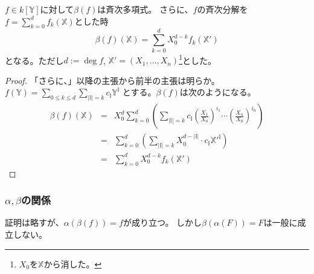 \documentclass[a4paper]{jsarticle}
\begin{document}
    \begin{Prop}
        $f \in k[\mathbb{Y}]$に対して$\beta (f)$は斉次多項式。
        さらに、$f$の斉次分解を$f=\sum^{d}_{k=0}{f_k(\mathbb{X})}$とした時
        \[ \beta(f)(\mathbb{X})=\sum^{d}_{k=0}{X_0^{d-k} f_k(\mathbb{X}')}\]
        となる。ただし$d:=\deg f$, $\mathbb{X}'=(X_1, \dots, X_n)$\footnote{$X_0$を$\mathbb{X}$から消した。}とした。
    \end{Prop}
    \begin{proof}
        「さらに、」以降の主張から前半の主張は明らか。
        $f(\mathbb{Y})=\sum_{0 \leq k \leq d}{ \sum_{|\mathbb{I}|=k}{c_\mathbb{I} \mathbb{Y}^{\mathbb{I}}} }$
        とする。$\beta(f)$は次のようになる。
        \begin{eqnarray*}
            \beta(f)(\mathbb{X})
            &=& X_0^d \sum^{d}_{k=0}{
                \left( \sum_{|\mathbb{I}|=k}{c_\mathbb{I}
                \left(\frac{X_1}{X_0}\right)^{i_1} \cdots \left(\frac{X_n}{X_0}\right)^{i_n}} \right)} \\
            &=& \sum^{d}_{k=0}{
                \left( \sum_{|\mathbb{I}|=k}{X_0^{d-|\mathbb{I}|} \cdot c_\mathbb{I} {\mathbb{X}'}^{\mathbb{I}}} \right)} \\
            &=& \sum^{d}_{k=0}{X_0^{d-k} f_k(\mathbb{X}')}
        \end{eqnarray*}
        
    \end{proof}

    \subsubsection{$\alpha, \beta$の関係}
    証明は略すが、$\alpha(\beta(f))=f$が成り立つ。
    しかし$\beta(\alpha(F))=F$は一般に成立しない。
\end{document}

